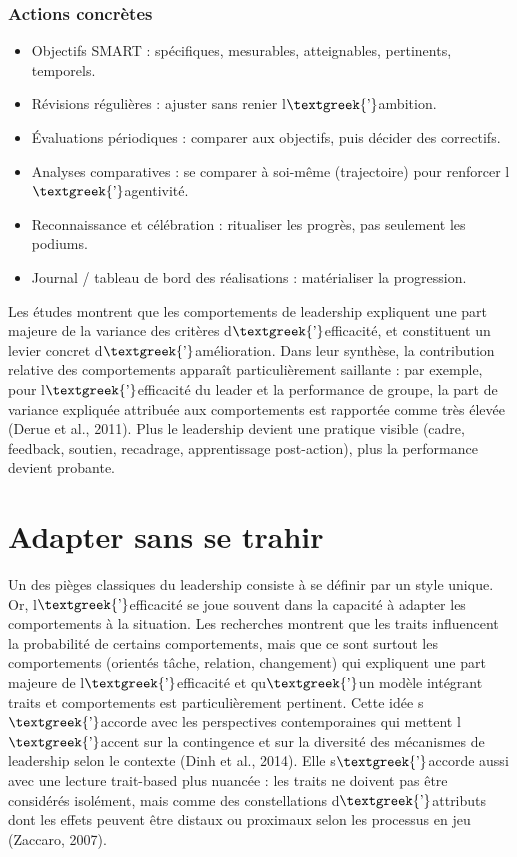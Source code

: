 \documentclass{article}
\begin{document}
\subsubsection{Actions concrètes}
\begin{itemize}
\item Objectifs SMART : spécifiques, mesurables, atteignables, pertinents, temporels.
\item Révisions régulières : ajuster sans renier l$\text{\textgreek{’}}$ambition.
\item Évaluations périodiques : comparer aux objectifs, puis décider des correctifs.
\item Analyses comparatives : se comparer à soi-même (trajectoire) pour renforcer l$\text{\textgreek{’}}$agentivité.
\item Reconnaissance et célébration : ritualiser les progrès, pas seulement les podiums.
\item Journal / tableau de bord des réalisations : matérialiser la progression. 
\end{itemize}
Les études montrent que les comportements de leadership expliquent une part majeure de la variance des critères
d$\text{\textgreek{’}}$efficacité, et constituent un levier concret d$\text{\textgreek{’}}$amélioration. Dans leur
synthèse, la contribution relative des comportements apparaît particulièrement saillante : par exemple, pour
l$\text{\textgreek{’}}$efficacité du leader et la performance de groupe, la part de variance expliquée attribuée aux
comportements est rapportée comme très élevée \label{ref:RND3WG3brbyy3}(Derue et al., 2011). Plus le leadership devient
une pratique visible (cadre, feedback, soutien, recadrage, apprentissage post-action), plus la performance devient
probante.

\section{Adapter sans se trahir}
Un des pièges classiques du leadership consiste à se définir par un style unique. Or, l$\text{\textgreek{’}}$efficacité
se joue souvent dans la capacité à adapter les comportements à la situation. Les recherches montrent que les traits
influencent la probabilité de certains comportements, mais que ce sont surtout les comportements (orientés tâche,
relation, changement) qui expliquent une part majeure de l$\text{\textgreek{’}}$efficacité et
qu$\text{\textgreek{’}}$un modèle intégrant traits et comportements est particulièrement pertinent. Cette idée
s$\text{\textgreek{’}}$accorde avec les perspectives contemporaines qui mettent l$\text{\textgreek{’}}$accent sur la
contingence et sur la diversité des mécanismes de leadership selon le contexte \label{ref:RNDKRAcioXr55}(Dinh et al.,
2014). Elle s$\text{\textgreek{’}}$accorde aussi avec une lecture trait-based plus nuancée : les traits ne doivent pas
être considérés isolément, mais comme des constellations d$\text{\textgreek{’}}$attributs dont les effets peuvent être
distaux ou proximaux selon les processus en jeu \label{ref:RNDITsmHNuXCg}(Zaccaro, 2007).
\end{document}
